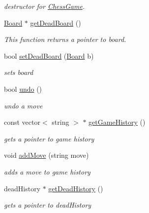 \begin{DoxyCompactItemize}
\begin{DoxyCompactList}\small\item\em destructor for \hyperlink{classChessGame}{ChessGame}. \item\end{DoxyCompactList}\item 
\hyperlink{classBoard}{Board} $\ast$ \hyperlink{classChessGame_aae64a8ad5e54881d22d17a63cbc3159d}{getDeadBoard} ()
\begin{DoxyCompactList}\small\item\em This function returns a pointer to board. \item\end{DoxyCompactList}\item 
bool \hyperlink{classChessGame_af39a867cb667ca6befdab8cddb48ea3e}{setDeadBoard} (\hyperlink{classBoard}{Board} b)
\begin{DoxyCompactList}\small\item\em sets board \item\end{DoxyCompactList}\item 
bool \hyperlink{classChessGame_a19ce1ce19741d65888e60d741f658394}{undo} ()
\begin{DoxyCompactList}\small\item\em undo a move \item\end{DoxyCompactList}\item 
const vector$<$ string $>$ $\ast$ \hyperlink{classChessGame_a4a6bd9631a46b9f59b6d1b619e743a1a}{getGameHistory} ()
\begin{DoxyCompactList}\small\item\em gets a pointer to game history \item\end{DoxyCompactList}\item 
void \hyperlink{classChessGame_ae91e34d3cff8c49c243d2a5f6164b4b6}{addMove} (string move)
\begin{DoxyCompactList}\small\item\em adds a move to game history \item\end{DoxyCompactList}\item 
deadHistory $\ast$ \hyperlink{classChessGame_a60066cc951dc9fa90e850dc8b57ab210}{getDeadHistory} ()
\begin{DoxyCompactList}\small\item\em gets a pointer to deadHistory \item\end{DoxyCompactList}\end{DoxyCompactItemize}


